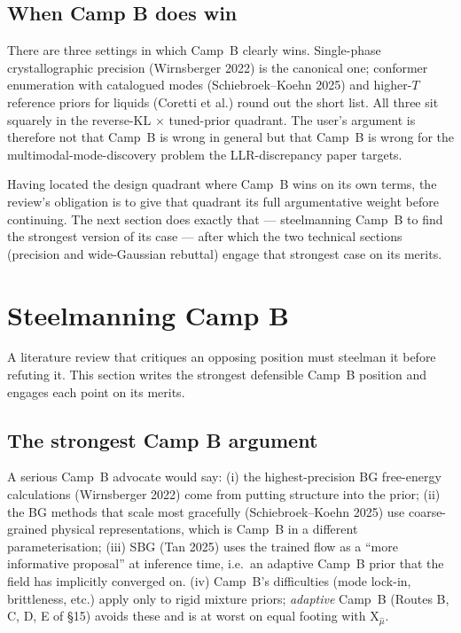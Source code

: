 \documentclass[11pt,letterpaper]{article}
\newcommand{\Xfun}{\mathrm{X}}
\theoremstyle{plain}
\begin{document}
\subsection{When Camp B does win}

There are three settings in which Camp~B clearly wins. Single-phase
crystallographic precision (Wirnsberger 2022) is the canonical one;
conformer enumeration with catalogued modes (Schiebroek--Koehn 2025) and
higher-$T$ reference priors for liquids (Coretti et al.) round out the
short list. All three sit squarely in the reverse-KL $\times$ tuned-prior
quadrant. The user's argument is therefore not that Camp~B is wrong in
general but that Camp~B is wrong for the multimodal-mode-discovery problem
the LLR-discrepancy paper targets.

Having located the design quadrant where Camp~B wins on its own terms, the
review's obligation is to give that quadrant its full argumentative weight
before continuing. The next section does exactly that --- steelmanning Camp~B
to find the strongest version of its case --- after which the two technical
sections (precision and wide-Gaussian rebuttal) engage that strongest case
on its merits.

\section{Steelmanning Camp B}

\begin{callout}
A literature review that critiques an opposing position must steelman it before
refuting it. This section writes the strongest defensible Camp~B position and
engages each point on its merits.
\end{callout}

\subsection{The strongest Camp B argument}

A serious Camp~B advocate would say: (i) the highest-precision BG free-energy
calculations (Wirnsberger 2022) come from putting structure into the prior;
(ii) the BG methods that scale most gracefully (Schiebroek--Koehn 2025) use
coarse-grained physical representations, which is Camp~B in a different
parameterisation; (iii) SBG (Tan 2025) uses the trained flow as a ``more
informative proposal'' at inference time, i.e.\ an adaptive Camp~B prior that the
field has implicitly converged on. (iv) Camp~B's difficulties (mode lock-in,
brittleness, etc.) apply only to rigid mixture priors; \emph{adaptive} Camp~B
(Routes B, C, D, E of \S15) avoids these and is at worst on equal footing with
$\Xfun_{\hat\mu}$.
\end{document}
